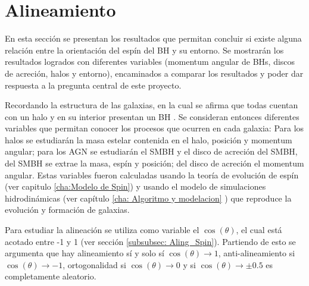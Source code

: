 \section{ Alineamiento}
\label{sec: Alineamiento}

En esta sección se presentan los resultados que permitan concluir si existe alguna relación entre la orientación del espín del BH y su entorno. Se mostrarán los resultados logrados con diferentes variables (momentum angular de BHs, discos de acreción, halos y entorno), encaminados a comparar los resultados y poder dar respuesta a la pregunta central de este proyecto. 

Recordando la estructura de las galaxias, en la cual se afirma que todas cuentan con un halo y en su interior presentan un BH \cite{schneider2006}.
Se consideran entonces diferentes variables que permitan conocer los procesos que ocurren en cada galaxia: Para los halos se estudiarán la masa estelar contenida en el halo, posición y momentum angular; para los AGN se estudiarán el SMBH y el disco de acreción del SMBH, del SMBH se extrae la masa, espín y posición; del disco de acreción el momentum angular. Estas variables fueron calculadas usando la teoría de evolución de espín (ver capitulo \ref{cha:Modelo de Spin}) y usando el modelo de simulaciones hidrodinámicas (ver capítulo \ref{cha: Algoritmo y modelacion} ) que reproduce la evolución y formación de galaxias. 

Para estudiar la alineación se utiliza como variable el $\cos (\theta)$, el cual está acotado entre -1 y 1 (ver sección \ref{subsubsec: Aling_Spin}). Partiendo de esto se argumenta que hay alineamiento sí y solo sí  $\cos (\theta) \to 1$, anti-alineamiento si $\cos (\theta)\to -1$, ortogonalidad si $\cos (\theta)\to 0$ y si $\cos (\theta)\to \pm 0.5 $ es  completamente aleatorio.




